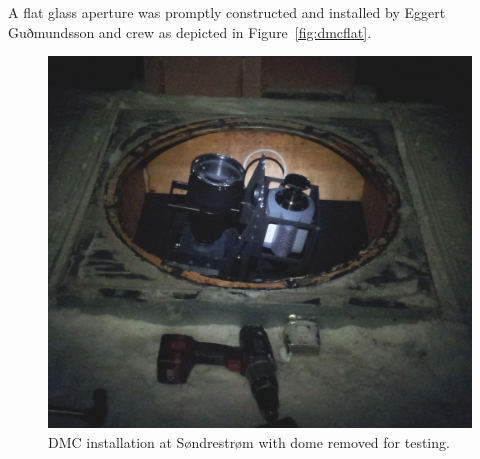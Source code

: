 A flat glass aperture was promptly constructed and installed by Eggert Guðmundsson and crew as depicted in Figure~\ref{fig:dmcflat}.
\begin{figure}\centering
	\includegraphics[width=\linewidth,trim=0 500 0 200,clip]{gfx/DMC_deployed_nodome}
	\caption{DMC installation at Søndrestrøm with dome removed for testing.}
	\label{fig:nodome}
\end{figure}
